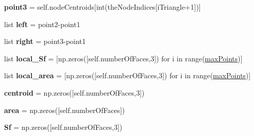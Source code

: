 \begin{DoxyCompactItemize}
{\bfseries point3} = self.\+node\+Centroids\mbox{[}int(the\+Node\+Indices\mbox{[}i\+Triangle+1\mbox{]})\mbox{]}
\item 
\mbox{\label{classpy_f_v_m_1_1_polymesh_1_1_polymesh_af9e0bdbeed2084aa15124a03cbd77355}} 
list {\bfseries left} = point2-\/point1
\item 
\mbox{\label{classpy_f_v_m_1_1_polymesh_1_1_polymesh_a8dc2844fb86e199fcc449da99c63ca26}} 
list {\bfseries right} = point3-\/point1
\item 
\mbox{\label{classpy_f_v_m_1_1_polymesh_1_1_polymesh_a32fa95eb533d40ab434642a32880616c}} 
list {\bfseries local\+\_\+\+Sf} = \mbox{[}np.\+zeros(\mbox{[}self.\+number\+Of\+Faces,3\mbox{]}) for i in range(\mbox{\hyperlink{classpy_f_v_m_1_1_polymesh_1_1_polymesh_afebf2be139681c451afde30c50beba9d}{max\+Points}})\mbox{]}
\item 
\mbox{\label{classpy_f_v_m_1_1_polymesh_1_1_polymesh_a54a4d01a5f825ad4519ffaf676327e0e}} 
list {\bfseries local\+\_\+area} = \mbox{[}np.\+zeros(\mbox{[}self.\+number\+Of\+Faces,3\mbox{]}) for i in range(\mbox{\hyperlink{classpy_f_v_m_1_1_polymesh_1_1_polymesh_afebf2be139681c451afde30c50beba9d}{max\+Points}})\mbox{]}
\item 
\mbox{\label{classpy_f_v_m_1_1_polymesh_1_1_polymesh_a6c1599405be449f8c9414b4faca5f788}} 
{\bfseries centroid} = np.\+zeros(\mbox{[}self.\+number\+Of\+Faces,3\mbox{]})
\item 
\mbox{\label{classpy_f_v_m_1_1_polymesh_1_1_polymesh_a2954c8e2e94454b0cb232d55f194a6eb}} 
{\bfseries area} = np.\+zeros(\mbox{[}self.\+number\+Of\+Faces\mbox{]})
\item 
\mbox{\label{classpy_f_v_m_1_1_polymesh_1_1_polymesh_aeb01be1db545763f446b6ff3df273040}} 
{\bfseries Sf} = np.\+zeros(\mbox{[}self.\+number\+Of\+Faces,3\mbox{]})
\item 
\mbox{\label{classpy_f_v_m_1_1_polymesh_1_1_polymesh_a7fb9d1af181ad2671ae3525132127b96}} 

\end{DoxyCompactItemize}
